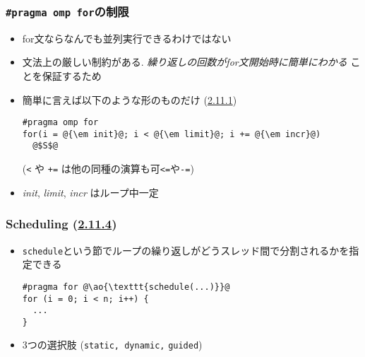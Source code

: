 \documentclass[10pt,dvipdfmx]{beamer}
\newcommand{\sectionompfor}{\href{https://www.openmp.org/spec-html/5.1/openmpsu48.html}{2.11.4}}
\newcommand{\sectioncanonicalloop}{\href{https://www.openmp.org/spec-html/5.1/openmpsu45.html\#x70-700002.11.1}{2.11.1}}
\newcommand{\ao}[1]{{\color{blue}#1}}
\begin{document}
\begin{frame}[fragile]
\frametitle{{\tt \#pragma omp for}の制限}
\begin{itemize}
\item for文ならなんでも並列実行できるわけではない
\item 文法上の厳しい制約がある. 
  \ao{\em 繰り返しの回数がfor文開始時に簡単にわかる}
  ことを保証するため
\item 簡単に言えば以下のような形のものだけ (\sectioncanonicalloop)
\begin{lstlisting}
#pragma omp for
for(i = @{\em init}@; i < @{\em limit}@; i += @{\em incr}@) 
  @$S$@
\end{lstlisting}
({\tt <} や {\tt +=} は他の同種の演算も可{\tt <=}や{\tt -=})
\item {\em init}, {\em limit}, {\em incr} はループ中一定
\end{itemize}
\end{frame}


\begin{frame}[fragile]
\frametitle{Scheduling (\sectionompfor)}
\begin{itemize}
\item \ao{\tt schedule}という節でループの繰り返しがどうスレッド間で分割されるかを指定できる
\begin{lstlisting}
#pragma for @\ao{\texttt{schedule(...)}}@
for (i = 0; i < n; i++) {
  ...
}
\end{lstlisting}
  
\item 3つの選択肢
  (\ao{\tt static, dynamic,} \ao{\tt guided})

\end{itemize}
\end{frame}
\end{document}

